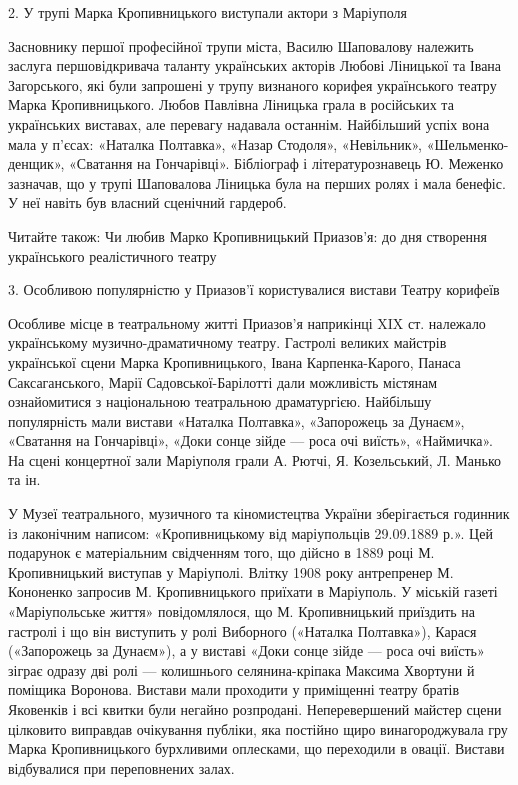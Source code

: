 2. У трупі Марка Кропивницького виступали актори з Маріуполя

Засновнику першої професійної трупи міста, Василю Шаповалову належить заслуга
першовідкривача таланту українських акторів Любові Ліницької та Івана
Загорського, які були запрошені у трупу визнаного корифея українського театру
Марка Кропивницького. Любов Павлівна Ліницька грала в російських та українських
виставах, але перевагу надавала останнім. Найбільший успіх вона мала у п'єсах:
«Наталка Полтавка», «Назар Стодоля», «Невільник», «Шельменко-денщик», «Сватання
на Гончарівці». Бібліограф і літературознавець Ю. Меженко зазначав, що у трупі
Шаповалова Ліницька була на перших ролях і мала бенефіс. У неї навіть був
власний сценічний гардероб.

Читайте також: Чи любив Марко Кропивницький Приазов’я: до дня створення українського реалістичного театру

3. Особливою популярністю у Приазов'ї користувалися вистави Театру корифеїв

Особливе місце в театральному житті Приазов'я наприкінці XIX ст.  належало
українському музично-драматичному театру. Гастролі великих майстрів української
сцени Марка Кропивницького, Івана Карпенка-Карого, Панаса Саксаганського, Марії
Садовської-Барілотті дали можливість містянам ознайомитися з національною
театральною драматургією. Найбільшу популярність мали вистави «Наталка
Полтавка», «Запорожець за Дунаєм», «Сватання на Гончарівці», «Доки сонце зійде
— роса очі виїсть», «Наймичка». На сцені концертної зали Маріуполя грали А.
Рютчі, Я. Козельський, Л. Манько та ін.

У Музеї театрального, музичного та кіномистецтва України зберігається годинник
із лаконічним написом: «Кропивницькому від маріупольців 29.09.1889 р.». Цей
подарунок є матеріальним свідченням того, що дійсно в 1889 році М.
Кропивницький виступав у Маріуполі. Влітку 1908 року антрепренер М. Кононенко
запросив М. Кропивницького приїхати в Маріуполь. У міській газеті
«Маріупольське життя» повідомлялося, що М. Кропивницький приїздить на гастролі
і що він виступить у ролі Виборного («Наталка Полтавка»), Карася («Запорожець
за Дунаєм»), а у виставі «Доки сонце зійде — роса очі виїсть» зіграє одразу дві
ролі — колишнього селянина-кріпака Максима Хвортуни й поміщика Воронова.
Вистави мали проходити у приміщенні театру братів Яковенків і всі квитки були
негайно розпродані. Неперевершений майстер сцени цілковито виправдав очікування
публіки, яка постійно щиро винагороджувала гру Марка Кропивницького бурхливими
оплесками, що переходили в овації. Вистави відбувалися при переповнених залах.

